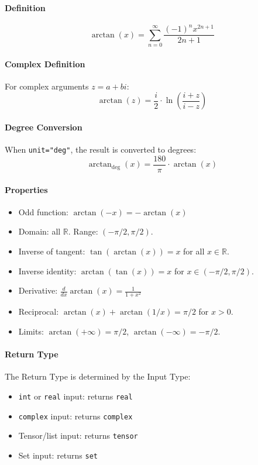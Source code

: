 \paragraph{Definition}
\[
\arctan(x) = \sum_{n=0}^{\infty} \frac{(-1)^n x^{2n+1}}{2n+1}
\]

\paragraph{Complex Definition}
For complex arguments $z = a + bi$:
\[
\arctan(z) = \frac{i}{2} \cdot \ln\left(\frac{i + z}{i - z}\right)
\]

\paragraph{Degree Conversion}
When \texttt{unit="deg"}, the result is converted to degrees:
\[
\arctan_{\text{deg}}(x) = \frac{180}{\pi} \cdot \arctan(x)
\]

\paragraph{Properties}
\begin{itemize}
\item Odd function: $\arctan(-x) = -\arctan(x)$
\item Domain: all $\mathbb{R}$. Range: $(-\pi/2, \pi/2)$.
\item Inverse of tangent: $\tan(\arctan(x)) = x$ for all $x \in \mathbb{R}$.
\item Inverse identity: $\arctan(\tan(x)) = x$ for $x \in (-\pi/2, \pi/2)$.
\item Derivative: $\frac{d}{dx}\arctan(x) = \frac{1}{1 + x^2}$
\item Reciprocal: $\arctan(x) + \arctan(1/x) = \pi/2$ for $x > 0$.
\item Limits: $\arctan(+\infty) = \pi/2$, $\arctan(-\infty) = -\pi/2$.
\end{itemize}

\paragraph{Return Type}
The Return Type is determined by the Input Type:
\begin{itemize}
\item \texttt{int} or \texttt{real} input: returns \texttt{real}
\item \texttt{complex} input: returns \texttt{complex}
\item Tensor/list input: returns \texttt{tensor}
\item Set input: returns \texttt{set}
\end{itemize}

